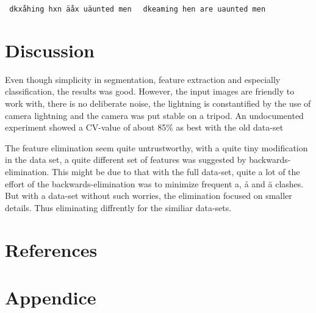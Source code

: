 \documentclass[a4paper,11pt]{article}
\begin{document}
\texttt{
dkxåhing
hxn äåx
uäunted
men
}
\texttt{
dkeaming
hen are
uaunted
men
}








\section{Discussion}

Even though simplicity in segmentation, feature extraction and especially classification, the results was good.
However, the input images are friendly to work with,
there is no deliberate noise, the lightning is constantified by the use of camera lightning and the camera was put stable on a tripod.
An undocumented experiment showed a CV-value of about 85\% as best with the old data-set 

The feature elimination seem quite untrustworthy,
with a quite tiny modification in the data set,
a quite different set of features was suggested by backwards-elimination.
This might be due to that with the full data-set,
quite a lot of the effort of the backwards-elimination was to minimize frequent a, å and ä clashes.
But with a data-set without such worries, the elimination focused on smaller details.
Thus eliminating diffrently for the similiar data-sets.

\section{References}
\section{Appendice}
\end{document}
